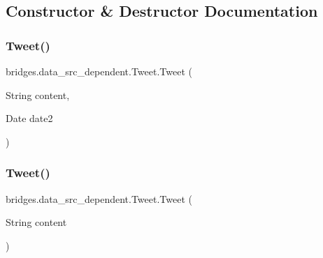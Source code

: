 \subsection{Constructor \& Destructor Documentation}
\hypertarget{classbridges_1_1data__src__dependent_1_1_tweet_a615278c2672b2cb310d3c645566ad5cd}{}\label{classbridges_1_1data__src__dependent_1_1_tweet_a615278c2672b2cb310d3c645566ad5cd} 
\subsubsection{\texorpdfstring{Tweet()}{Tweet()}\hspace{0.1cm}{\footnotesize\ttfamily [1/3]}}
{\footnotesize\ttfamily bridges.\+data\+\_\+src\+\_\+dependent.\+Tweet.\+Tweet (\begin{DoxyParamCaption}\item[{String}]{content,  }\item[{Date}]{date2 }\end{DoxyParamCaption})}

\hypertarget{classbridges_1_1data__src__dependent_1_1_tweet_a611e969f630c86098b204cfb4655f79b}{}\label{classbridges_1_1data__src__dependent_1_1_tweet_a611e969f630c86098b204cfb4655f79b} 
\subsubsection{\texorpdfstring{Tweet()}{Tweet()}\hspace{0.1cm}{\footnotesize\ttfamily [2/3]}}
{\footnotesize\ttfamily bridges.\+data\+\_\+src\+\_\+dependent.\+Tweet.\+Tweet (\begin{DoxyParamCaption}\item[{String}]{content }\end{DoxyParamCaption})}

\hypertarget{classbridges_1_1data__src__dependent_1_1_tweet_a0b0ee5fa9a6221da95020bd5f78667d9}{}\label{classbridges_1_1data__src__dependent_1_1_tweet_a0b0ee5fa9a6221da95020bd5f78667d9} 
